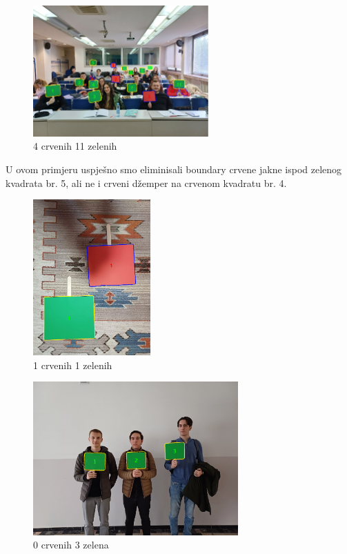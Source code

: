 \documentclass[a4paper,12pt]{article}
\begin{document}
\begin{figure}[htbp]
    \centering
    \includegraphics[width=0.6\textwidth]{studenti2.png}
    \caption{4 crvenih 11 zelenih}
    \label{fig:example}
\end{figure}
U ovom primjeru uspješno smo eliminisali boundary crvene jakne ispod zelenog kvadrata br. 5, ali ne i crveni džemper na crvenom kvadratu br. 4.
\begin{figure}[htbp]
    \centering
    \includegraphics[width=0.4\textwidth]{kvadrati_test.png}
    \caption{1 crvenih 1 zelenih}
    \label{fig:example}
\end{figure}
\begin{figure}[htbp]
    \centering
    \includegraphics[width=0.7\textwidth]{kolege_1_crop.png}
    \caption{0 crvenih 3 zelena}
    \label{fig:example}
\end{figure}
\end{document}
